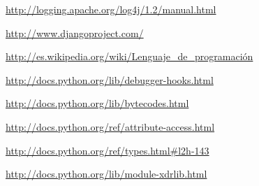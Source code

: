 \documentclass[12pt,legalpaper]{report}
\begin{document}
\begin{thebibliography}{30}

\href{http://logging.apache.org/log4j/1.2/manual.html}{http://logging.apache.org/log4j/1.2/manual.html}


\href{http://www.djangoproject.com/}{http://www.djangoproject.com/}


\href{http://es.wikipedia.org/wiki/Lenguaje_de_programación}{http://es.wikipedia.org/wiki/Lenguaje\_de\_programación}


\href{http://docs.python.org/lib/debugger-hooks.html}{http://docs.python.org/lib/debugger-hooks.html}


\href{http://docs.python.org/lib/bytecodes.html}{http://docs.python.org/lib/bytecodes.html}


\href{http://docs.python.org/ref/attribute-access.html}{http://docs.python.org/ref/attribute-access.html}


\href{http://docs.python.org/ref/types.html\#l2h-143}{http://docs.python.org/ref/types.html\#l2h-143}


\href{http://docs.python.org/lib/module-xdrlib.html}{http://docs.python.org/lib/module-xdrlib.html}


\end{thebibliography}
\end{document}
